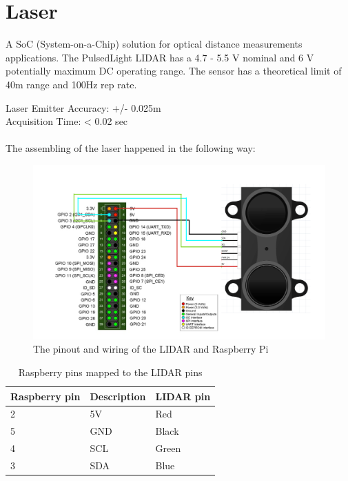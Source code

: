 \clearpage
\section{Laser}

A SoC (System-on-a-Chip) solution for optical distance measurements applications. The PulsedLight LIDAR has a 4.7 - 5.5 V nominal and 6 V potentially maximum DC operating range. The sensor has a theoretical limit of 40m range and 100Hz rep rate.

Laser Emitter Accuracy: +/- 0.025m \\
Acquisition Time: < 0.02 sec \\
\\

The assembling of the laser happened in the following way:

\begin{figure}[H]
	\centering
	\includegraphics[scale=.4]{images/laderraspberryconnection.png}
	\caption{The pinout and wiring of the LIDAR and Raspberry Pi}
	\label{fig:wiringlidarpi}
\end{figure}

\begin{table}[H]
	\centering
	\begin{tabular}{|l|l|l|}
		\hline
		\textbf{Raspberry pin} & \textbf{Description} & \textbf{LIDAR pin} \\ \hline
		2 & 5V & Red \\ \hline
		5 & GND & Black \\ \hline
		4 & SCL & Green \\ \hline
		3 & SDA & Blue \\ \hline
	\end{tabular}
	\caption{Raspberry pins mapped to the LIDAR pins}
\end{table}

